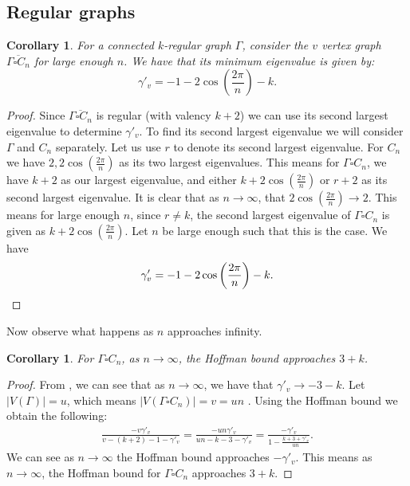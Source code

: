 \documentclass[11pt, baustms]{amsproc}
\theoremstyle{scplain}
\newtheorem{corollary}[theorem]{Corollary}
\begin{document}
\subsection{Regular graphs}

 \begin{corollary}
	\label{method}
	For a connected $k$-regular graph $\Gamma$, consider the $v$ vertex graph $\overline{\Gamma \square C_n}$ for large enough $n$. We have that its minimum eigenvalue is given by: $$\gamma'_{v} = -1-2\cos\left(\frac{2\pi}{n}\right)-k.$$
	\end{corollary}
    
	\begin{proof}
		Since $\overline{\Gamma \square C_n}$ is regular (with valency $k+2$) we can use its second largest eigenvalue to determine $\gamma'_{v}$. To find its second largest eigenvalue we will consider $\Gamma$ and $C_n$ separately. Let us use $r$ to denote its second largest eigenvalue. For $C_n$ we have $2,2\cos\left(\frac{2\pi}{n}\right)$ as its two largest eigenvalues. This means for $\Gamma \square C_n$, we have $k+2$ as our largest eigenvalue, and either $k+2\cos\left(\frac{2\pi}{n}\right)$ or $r+2$ as its second largest eigenvalue. It is clear that as $n \rightarrow \infty$, that $2\cos\left(\frac{2\pi}{n}\right) \rightarrow 2$. This means for large enough $n$, since $r \neq k$, the second largest eigenvalue of $\Gamma \square C_n$ is given as $k+2 \cos \left(\frac{2\pi}{n}\right)$. Let $n$ be large enough such that this is the case. We have \[\gamma'_{v} = -1-2\cos\left(\frac{2\pi}{n}\right)-k. \qedhere\]
	\end{proof}

    Now observe what happens as $n$ approaches infinity.

	\begin{corollary}
	\label{CAPHoff}
	For $\Gamma \square C_n$, as $n \rightarrow \infty$, the Hoffman bound approaches $3+k$.
	\end{corollary}
	\begin{proof}
	From , we can see that as $n \rightarrow \infty$, we have that $\gamma'_{v} \rightarrow -3-k$. Let $|V(\Gamma)| = u$, which means $|V(\Gamma \square C_n)|= v = un$ . Using the Hoffman bound we obtain the following: \begin{align*} \frac{-v \gamma'_{v}}{v-(k+2)-1-\gamma'_{v}}  = \frac{-un \gamma'_{v}}{un-k-3-\gamma'_{v}} = \frac{- \gamma'_{v}}{1-\frac{k+3+\gamma'_{v}}{un}}.\end{align*} We can see as $n \rightarrow \infty$ the Hoffman bound approaches $-\gamma'_{v}$. This means as $n \rightarrow \infty$, the Hoffman bound for $\Gamma \square C_n$ approaches $3+k$.
	\end{proof}
\end{document}
